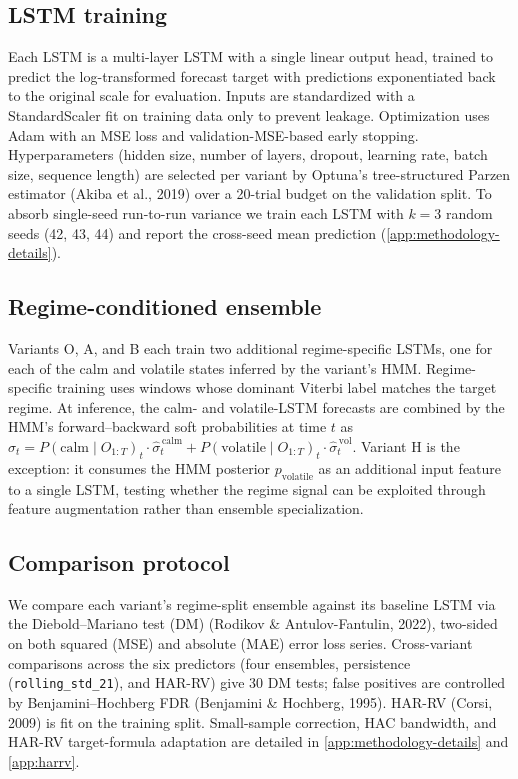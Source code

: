 \documentclass{article}
\newcommand{\code}[1]{\texttt{\small #1}}
\begin{document}
  \subsection{LSTM training}
Each LSTM is a multi-layer LSTM with a single linear output head, trained to predict the log-transformed forecast target with predictions exponentiated back to the original
  scale for evaluation. Inputs are standardized with a StandardScaler fit on training data only to prevent leakage. Optimization uses Adam with an MSE loss and
  validation-MSE-based early stopping. Hyperparameters (hidden size, number of layers, dropout, learning rate, batch size, sequence length) are selected per variant by Optuna's tree-structured Parzen estimator (Akiba et al., 2019) over a 20-trial budget on the validation split. To absorb single-seed run-to-run variance we train each LSTM with $k=3$ random seeds (42, 43, 44) and report the cross-seed mean prediction (\cref{app:methodology-details}).

    \subsection{Regime-conditioned ensemble}
    \label{sec:methodology-ensemble}

  Variants O, A, and B each train two additional regime-specific LSTMs, one for each of the calm and volatile states inferred by the variant's HMM. Regime-specific training uses windows whose dominant Viterbi label matches the target regime. At inference, the calm- and volatile-LSTM forecasts are combined by the HMM's forward--backward soft probabilities at time $t$ as $\hat\sigma_t = P(\text{calm} \mid O_{1:T})_t \cdot \hat\sigma^{\,\text{calm}}_t + P(\text{volatile} \mid O_{1:T})_t \cdot \hat\sigma^{\,\text{vol}}_t$. Variant H is the exception: it consumes the HMM posterior $p_{\text{volatile}}$ as an additional input feature to a single LSTM, testing whether the regime signal can be exploited through feature augmentation rather than ensemble specialization.


  \subsection{Comparison protocol}

We compare each variant's regime-split ensemble against its baseline LSTM via the Diebold--Mariano test (DM) (Rodikov \& Antulov-Fantulin, 2022), two-sided on both squared (MSE) and absolute (MAE) error loss series. Cross-variant comparisons across the six predictors (four ensembles, persistence (\code{rolling\_std\_21}), and HAR-RV) give 30 DM tests; false positives are controlled by Benjamini--Hochberg FDR (Benjamini \& Hochberg, 1995). HAR-RV (Corsi, 2009) is fit on the training split. Small-sample correction, HAC bandwidth, and HAR-RV target-formula adaptation are detailed in \cref{app:methodology-details} and \cref{app:harrv}.
\end{document}

